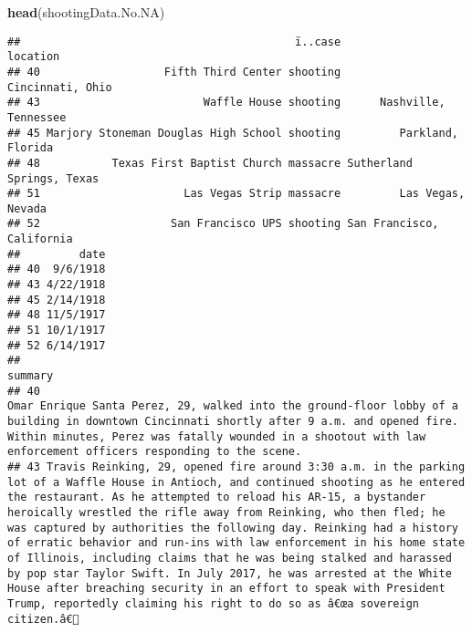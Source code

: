 \documentclass[
]{article}
\newenvironment{Shaded}{\begin{snugshade}}{\end{snugshade}}
\newcommand{\FunctionTok}[1]{\textcolor[rgb]{0.13,0.29,0.53}{\textbf{#1}}}
\newcommand{\NormalTok}[1]{#1}
\begin{document}
\begin{Shaded}
\begin{Highlighting}[]
\FunctionTok{head}\NormalTok{(shootingData.No.NA)}
\end{Highlighting}
\end{Shaded}

\begin{verbatim}
##                                          ï..case                  location
## 40                   Fifth Third Center shooting          Cincinnati, Ohio
## 43                         Waffle House shooting      Nashville, Tennessee
## 45 Marjory Stoneman Douglas High School shooting         Parkland, Florida
## 48           Texas First Baptist Church massacre Sutherland Springs, Texas
## 51                      Las Vegas Strip massacre         Las Vegas, Nevada
## 52                    San Francisco UPS shooting San Francisco, California
##         date
## 40  9/6/1918
## 43 4/22/1918
## 45 2/14/1918
## 48 11/5/1917
## 51 10/1/1917
## 52 6/14/1917
##                                                                                                                                                                                                                                                                                                                                                                                                                                                                                                                                                                                                                                                                                                                 summary
## 40                                                                                                                                                                                                                                                                                                                                                                                                                                                           Omar Enrique Santa Perez, 29, walked into the ground-floor lobby of a building in downtown Cincinnati shortly after 9 a.m. and opened fire. Within minutes, Perez was fatally wounded in a shootout with law enforcement officers responding to the scene.
## 43 Travis Reinking, 29, opened fire around 3:30 a.m. in the parking lot of a Waffle House in Antioch, and continued shooting as he entered the restaurant. As he attempted to reload his AR-15, a bystander heroically wrestled the rifle away from Reinking, who then fled; he was captured by authorities the following day. Reinking had a history of erratic behavior and run-ins with law enforcement in his home state of Illinois, including claims that he was being stalked and harassed by pop star Taylor Swift. In July 2017, he was arrested at the White House after breaching security in an effort to speak with President Trump, reportedly claiming his right to do so as â€œa sovereign citizen.â€ 

\end{verbatim}
\end{document}
